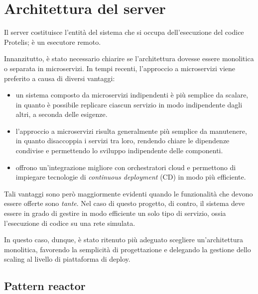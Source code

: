 
  \section{Architettura del server}\label{sec:arch:server}

    Il server costituisce l'entità del sistema che si occupa dell'esecuzione del codice Protelis; è un esecutore remoto.

    Innanzitutto, è stato necessario chiarire se l'architettura dovesse essere monolitica o separata in microservizi.
    In tempi recenti, l'approccio a microservizi viene preferito a causa di diversi vantaggi:

    \begin{itemize}
      \item
        un sistema composto da microservizi indipendenti è più semplice da scalare,
        in quanto è possibile replicare ciascun servizio in modo indipendente dagli altri, a seconda delle esigenze.
      \item
        l'approccio a microservizi risulta generalmente più semplice da manutenere,
        in quanto disaccoppia i servizi tra loro, rendendo chiare le dipendenze condivise e permettendo lo sviluppo indipendente delle componenti.
      \item
        offrono un'integrazione migliore con orchestratori cloud e permettono di impiegare tecnologie di \emph{continuous deployment} (CD) in modo più efficiente.
    \end{itemize}

    Tali vantaggi sono però maggiormente evidenti quando le funzionalità che devono essere offerte sono \emph{tante}.
    Nel caso di questo progetto, di contro, il sistema deve essere in grado di gestire in modo efficiente un solo tipo di servizio, ossia l'esecuzione di codice su una rete simulata.

    In questo caso, dunque, è stato ritenuto più adeguato scegliere un'architettura monolitica, favorendo la semplicità di progettazione
    e delegando la gestione dello scaling al livello di piattaforma di deploy.

    \subsection{Pattern reactor}\label{subsec:reactor}


